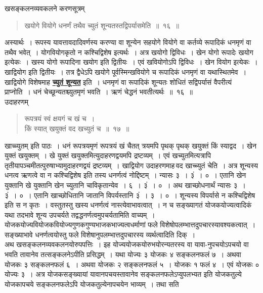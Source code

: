 \documentclass[11pt, openany]{book}
\begin{document}
\begin{center}
    \Large खसङ्कलनव्यवकलने करणसूत्रम्
\end{center}

 \label{16}
\begin{quote}
    \ab
    खयोगे वियोगे धनर्णं तथैव च्युतं शून्यतस्तद्विपर्यासमेति~॥~१६~॥
\end{quote}

अस्यार्थः~। रूपस्य यावत्तावदादिवर्णस्य करण्या वा शून्येन सहयोगे वियोगे
वा कर्तव्ये रूपादिकं धनमृणं वा तथैव भवेत्~। योगवियोगकृतो न कश्चिद्विशेष
इत्यर्थः~। अत्र खयोगो द्विविधः~। खेन योगो रूपादेः खयोग इत्येकः~। खस्य योगो
रूपादिना खयोग इति द्वितीयः~। एवं खवियोगोऽपि द्विविधः~। खेन वियोग इत्येकः~।
खाद्वियोग इति द्वितीयः~। तत्र द्वैधेऽपि खयोगे पूर्वस्मिन्खवियोगे च रूपादिकं
धनमृणं वा
\newpage
\noindent यथास्थितमेव~। खाद्वियोगे विशेषमाह \hyperref[16]{\textbf{च्युतं शून्यत}} इति~। धनमृणं वा
रूपादिकं शून्यतः शोधितं सद्विपर्यासं वैपरीत्यं प्राप्नोति~। धनं
चेच्छून्यतश्च्युतमृणं भवति~। ऋणं चेद्धनं भवतीत्यर्थः~॥~१६~॥\\

\vspace{-2mm}
{\bqt उदाहरणम्\textendash \,}
\begin{quote}
    \eg
    रूपत्रयं स्वं क्षयगं च खं च~। \\
 किं स्यात् खयुक्तं वद खच्युतं च~॥~१७~॥~
\end{quote}
 
खाच्च्युतम् इति पाठः~। धनं रूपत्रयमृणं रूपत्रयं खं चैतत् त्रयमपि पृथक्
पृथक् खयुक्तं किं स्याद्वद~। खेन युक्तं खयुक्तम्~। खे युक्तं
खयुक्तमित्युदाहरणद्वयमपि द्रष्टव्यम्~। एवं खच्युतमित्यत्रापि
तृतीयापञ्चमीतत्पुरुषाभ्यामुदाहरणद्वयं द्रष्टव्यम्~।
खाद्वियोग उदाहरणमाह\textendash \,वद खाच्च्युतं चेति~। अत्र शून्यस्य धनत्व ऋणत्वे
वा न कश्चिद्विशेष इति तस्य धनर्णत्वं नोद्दिष्टम्~। न्यासः ३~। ३ं~। ०~। एतानि
खेन युक्तानि खे युक्तानि खेन च्युतानि चाविकृतान्येव~। ६~। ३ं~। ०~। अथ
खाच्छोधनार्थं न्यासः ३~। ३ं~। ०~। एतानि खाच्छोधितानि जातानि विपर्यस्तानि
३ं~। ३~। ०~। शून्यस्य विपर्यासे न कश्चिद्विशेष इति स न कृतः~।
वस्तुतस्तु खस्य धनर्णत्वं नास्त्येवाभावत्वात्~। न च सङ्ख्यागतं
योजकयोज्यत्वादिकं यथा तदभावे शून्य उपचर्यते
तद्वद्धनर्णत्वमुपचर्यतामिति वाच्यम्~। योजकयोज्यवियोजकवियोज्यगुणकगुण्यभाजकभाज्यत्वधर्माणां फले
विशेषोपलम्भात्तदुपचारस्यावश्यकत्वात्~। सङ्ख्याभावे धनर्णत्वयोस्तु फले
विशेषानुपलम्भात्तदुपचारस्य व्यर्थत्वादिति दिक्~।\\

\vspace{-4mm}
अथ खसङ्कलनव्यवकलनयोरुपपत्तिः~। इह योज्ययोजकयोरुभयोरन्यतरस्य वा
यावा-नुपचयोऽपचयो वा भवति तावानेव तत्सङ्कलनेऽपीति प्रसिद्धम्~। यथा
योज्यः ३ योजकः ४ सङ्कलनफलं ७~। अथवा योजकः ३ सङ्कलनफलं ६~। अथवा
योजकः २ सङ्कलनफलं ५~। योजकः १ फलं ४~। एवं योजकः ० योज्यः ३~।
अत्र योजकसङ्ख्यायां यावानपचयस्तावानेव सङ्कलनफलेऽप्युपलभ्यत इति
योजकतुल्ये योजकापचये सङ्कलनफलेऽपि योजकतुल्येनापचयेन भाव्यम्~। तथा सति
\newpage
\end{document}
